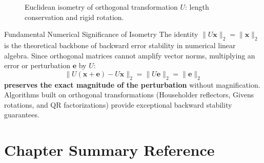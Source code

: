 \begin{figure}[H]
\centering
{}
\caption{Euclidean isometry of orthogonal transformation $U$: length conservation and rigid rotation.}
\label{fig:orthogonal-isometry}
\end{figure}

\begin{noteblock}{Fundamental Numerical Significance of Isometry}
The identity $\|U\mathbf{x}\|_2 = \|\mathbf{x}\|_2$ is the theoretical backbone of backward error stability in numerical linear algebra. Since orthogonal matrices cannot amplify vector norms, multiplying an error or perturbation $\mathbf{e}$ by $U$:
\begin{equation}
    \|U(\mathbf{x} + \mathbf{e}) - U\mathbf{x}\|_2 = \|U\mathbf{e}\|_2 = \|\mathbf{e}\|_2
\end{equation}
\textbf{preserves the exact magnitude of the perturbation} without magnification. Algorithms built on orthogonal transformations (Householder reflectors, Givens rotations, and QR factorizations) provide exceptional backward stability guarantees.
\end{noteblock}

\clearpage
\section{Chapter Summary Reference}

